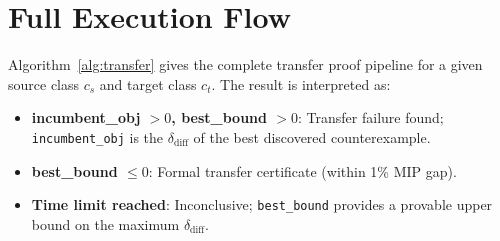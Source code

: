 \documentclass[11pt,a4paper]{article}
\theoremstyle{definition}
\theoremstyle{plain}
\newcommand{\deltadiff}{\delta_{\mathrm{diff}}}
\begin{document}
\section{Full Execution Flow}
\label{sec:execution}

Algorithm~\ref{alg:transfer} gives the complete transfer proof pipeline for a given source class $c_s$ and target class $c_t$. The result is interpreted as:
\begin{itemize}
  \item \textbf{incumbent\_obj $> 0$, best\_bound $> 0$}: Transfer failure found; \texttt{incumbent\_obj} is the $\deltadiff$ of the best discovered counterexample.
  \item \textbf{best\_bound $\le 0$}: Formal transfer certificate (within 1\% MIP gap).
  \item \textbf{Time limit reached}: Inconclusive; \texttt{best\_bound} provides a provable upper bound on the maximum $\deltadiff$.
\end{itemize}
\end{document}
